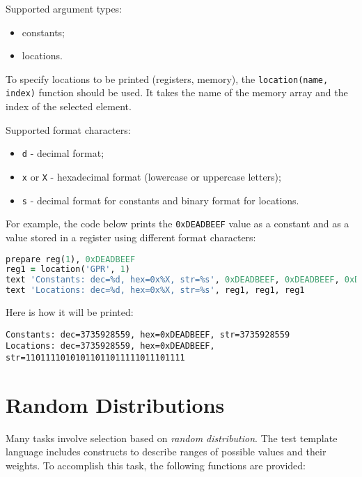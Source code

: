 \documentclass[oneside,final,12pt]{extreport}
\begin{document}
Supported argument types:
\begin{itemize}
\item constants;
\item locations.
\end{itemize}

To specify locations to be printed (registers, memory), the \texttt{location(name, index)}
function should be used. It takes the name of the memory array and the index of the selected
element.

Supported format characters:
\begin{itemize}
\item \texttt{d} - decimal format;
\item \texttt{x} or \texttt{X} - hexadecimal format (lowercase or uppercase letters);
\item \texttt{s} - decimal format for constants and binary format for locations.
\end{itemize}

For example, the code below prints the \texttt{0xDEADBEEF} value as a constant and as
a value stored in a register using different format characters:

\begin{lstlisting}[language=ruby]
prepare reg(1), 0xDEADBEEF
reg1 = location('GPR', 1)
text 'Constants: dec=%d, hex=0x%X, str=%s', 0xDEADBEEF, 0xDEADBEEF, 0xDEADBEEF
text 'Locations: dec=%d, hex=0x%X, str=%s', reg1, reg1, reg1
\end{lstlisting}

Here is how it will be printed:

\begin{lstlisting}
Constants: dec=3735928559, hex=0xDEADBEEF, str=3735928559
Locations: dec=3735928559, hex=0xDEADBEEF, str=11011110101011011011111011101111
\end{lstlisting}


\section{Random Distributions}
\label{Random_Distributions}

Many tasks involve selection based on \emph{random distribution}. The test template
language includes constructs to describe ranges of possible values and their weights.
To accomplish this task, the following functions are provided:
\end{document}
